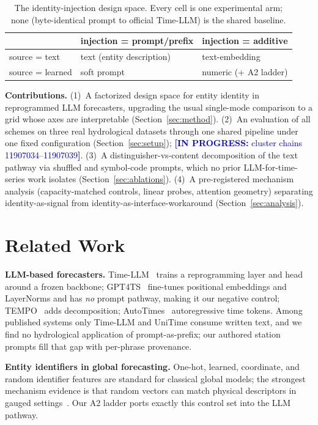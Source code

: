 \documentclass[sigconf,review]{acmart}
\newcommand{\inprogress}[1]{\textcolor{blue}{\textbf{[IN PROGRESS:} #1\textbf{]}}}
\begin{document}
\begin{table}[t]
\caption{The identity-injection design space. Every cell is one experimental arm;
\textsf{none} (byte-identical prompt to official Time-LLM) is the shared baseline.}
\label{tab:grid}
\begin{tabular}{@{}lll@{}}
\toprule
 & injection = prompt/prefix & injection = additive \\
\midrule
source = text & \textsf{text} (entity description) & \textsf{text-embedding} \\
source = learned & \textsf{soft prompt} & \textsf{numeric} (+ A2 ladder) \\
\bottomrule
\end{tabular}
\end{table}

\noindent\textbf{Contributions.}
(1)~A factorized design space for entity identity in reprogrammed LLM forecasters,
upgrading the usual single-mode comparison to a grid whose axes are interpretable
(Section~\ref{sec:method}).
(2)~An evaluation of all schemes on three real hydrological datasets through one
shared pipeline under one fixed configuration (Section~\ref{sec:setup});
\inprogress{cluster chains 11907034--11907039}.
(3)~A distinguisher-vs-content decomposition of the text pathway via shuffled and
symbol-code prompts, which no prior LLM-for-time-series work isolates
(Section~\ref{sec:ablations}).
(4)~A pre-registered mechanism analysis (capacity-matched controls, linear probes,
attention geometry) separating identity-as-signal from
identity-as-interface-workaround (Section~\ref{sec:analysis}).

\section{Related Work}
\label{sec:related}

\textbf{LLM-based forecasters.} Time-LLM~\cite{jin2024timellm} trains a
reprogramming layer and head around a frozen backbone;
GPT4TS~\cite{zhou2023onefitsall} fine-tunes positional embeddings and LayerNorms and
has \emph{no} prompt pathway, making it our negative control;
TEMPO~\cite{cao2024tempo} adds decomposition; AutoTimes~\cite{liu2024autotimes}
autoregressive time tokens. Among published systems only Time-LLM and UniTime consume
written text, and we find no hydrological application of prompt-as-prefix; our
authored station prompts fill that gap with per-phrase provenance.

\textbf{Entity identifiers in global forecasting.} One-hot, learned, coordinate, and
random identifier features are standard for classical global models; the strongest
mechanism evidence is that random vectors can match physical descriptors in gauged
settings~\cite{li2022random}. Our A2 ladder ports exactly this control set into the
LLM pathway.
\end{document}
